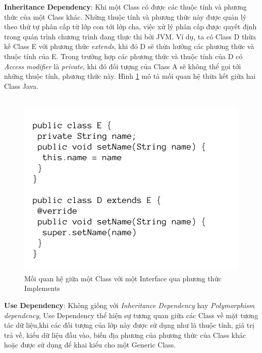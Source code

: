 \documentclass[12pt]{report}
\begin{document}
\newpage
\noindent \textbf{Inheritance Dependency}: Khi một Class có được các thuộc tính và phương thức của một Class khác. Những thuộc tính và phương thức này được quản lý theo thứ tự phân cấp từ lớp con tới lớp cha, việc xử lý phân cấp được quyết định trong quán trình chương trình đang thực thi bởi JVM. Ví dụ, ta có Class D thừa kế Class E với phương thức \textit{extends}, khi đó D sẽ thừa hưởng các phương thức và thuộc tính của E. Trong trường hợp các phương thức và thuộc tính của D có \textit{Access modifier} là \textit{private}, khi đó đối tượng của Class A sẽ không thể gọi tới những thuộc tính, phương thức này. Hình \ref{fig:D_extends_E} mô tả mối quan hệ thừa kết giữa hai Class Java.\\\\
\begin{figure}[!htbp]
	\centering
	\vspace{-1.5cm}
	\includegraphics[scale=0.35]{images/D_extends_E}
	\caption{Mối quan hệ giữa một Class với một Interface qua phương thức Implements}
	\label{fig:D_extends_E}
\end{figure}

\noindent \textbf{Use Dependency}: Không giống với \textit{Inheritance Dependency} hay \textit{Polymorphism dependency}, Use Dependency thể hiện sự tương quan giữa các Class về mặt tương tác dữ liệu,khi các đối tượng của lớp này được sử dụng như là thuộc tính, giá trị trả về, kiểu dữ liệu đầu vào, biến địa phương của phương thức của Class khác hoặc được sử dụng để khai kiểu cho một Generic Class.
\end{document}
